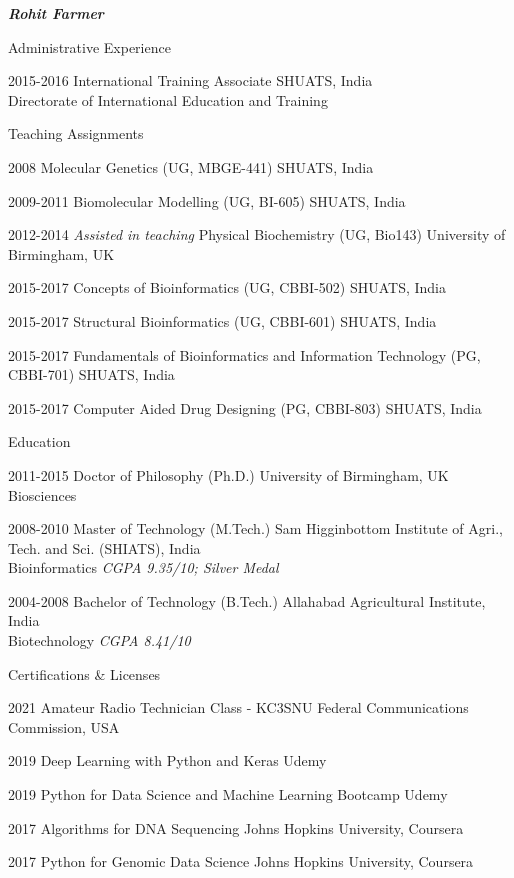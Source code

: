 \documentclass[10pt]{article}
\begin{document}
\begin{cv}{\huge \it \bfseries Rohit Farmer}
\begin{cvlist}{Administrative Experience}
	\item[2015-2016] International Training Associate \hfill SHUATS, India \\  \hspace*{\fill} Directorate of International Education and Training
\end{cvlist}

\begin{cvlist}{Teaching Assignments}
	\item[2008] Molecular Genetics (UG, MBGE-441) \hfill SHUATS, India 
	\item[2009-2011] Biomolecular Modelling (UG, BI-605)  \hfill SHUATS, India
	\item[2012-2014] \emph{Assisted in teaching} Physical Biochemistry (UG, Bio143) \hfill University of Birmingham, UK
	\item[2015-2017] Concepts of Bioinformatics (UG, CBBI-502) \hfill SHUATS, India 
	\item[2015-2017] Structural Bioinformatics (UG, CBBI-601)  \hfill SHUATS, India 
	\item[2015-2017] Fundamentals of Bioinformatics and Information Technology (PG, CBBI-701) \hfill SHUATS, India
	\item[2015-2017] Computer Aided Drug Designing (PG, CBBI-803) \hfill SHUATS, India
\end{cvlist}

\begin{cvlist}{Education}
	\item[2011-2015] Doctor of Philosophy (Ph.D.) \hfill University of Birmingham, UK \\ Biosciences
	\item[2008-2010] Master of Technology (M.Tech.) \hfill Sam Higginbottom Institute of Agri., Tech. and Sci. (SHIATS), India  \\ Bioinformatics \emph{CGPA 9.35/10; Silver Medal}
	\item[2004-2008] Bachelor of Technology (B.Tech.) \hfill Allahabad Agricultural Institute, India  \\ Biotechnology \emph{CGPA 8.41/10}
\end{cvlist}

\begin{cvlist}{Certifications \& Licenses}
        \item[2021] Amateur Radio Technician Class - KC3SNU \hfill Federal Communications Commission, USA
        \item[2019] Deep Learning with Python and Keras \hfill Udemy
        \item[2019] Python for Data Science and Machine Learning Bootcamp \hfill Udemy
        \item[2017] Algorithms for DNA Sequencing \hfill Johns Hopkins University, Coursera
	\item[2017] Python for Genomic Data Science \hfill Johns Hopkins University, Coursera
\end{cvlist}


\end{cv}
\end{document}

